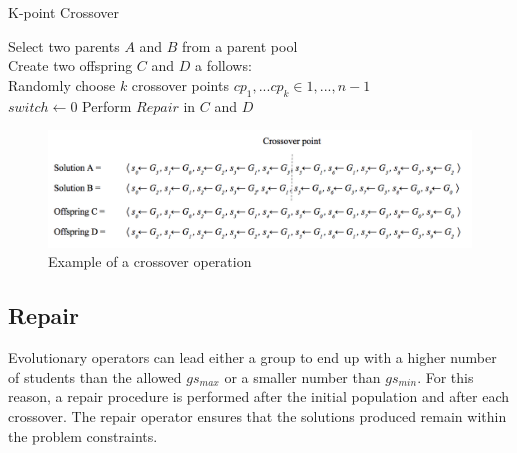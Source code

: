 \begin{algorithm}[H]
    \caption{K-point Crossover}
    \label{alg:crossover}
    \SetAlgoLined 
Select two parents $A$ and $B$ from a parent pool\;\\
Create two offspring $C$ and $D$ a follows:\;\\
Randomly choose $k$ crossover points $cp_1,...cp_k \in {1,...,n-1}$\;\\
$switch \gets 0$
Perform $Repair$ in $C$ and $D$
\end{algorithm}

\begin{figure}
    \centering
    \includegraphics[width=1.0\textwidth]{images/cross_over_g.png}
    \caption{Example of a crossover operation}
    \label{fig:crossover_ex}
\end{figure}


\subsection{Repair} \label{sec:Repair}

Evolutionary operators can lead either a group to end up with a higher number of students than the allowed $gs_{max}$ or a smaller number than $gs_{min}$. For this reason, a repair procedure is performed after the initial population and after each crossover. The repair operator ensures that the solutions produced remain within the problem constraints.\\

